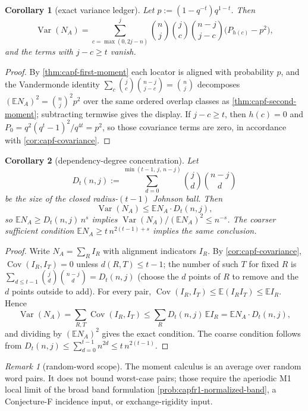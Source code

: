 \documentclass[11pt]{article}
\newtheorem{corollary}[corollary]{Corollary}
\theoremstyle{definition}
\theoremstyle{remark}
\newtheorem{remark}[remark]{Remark}
\providecommand{\E}{\mathbb E}
\providecommand{\Var}{\operatorname{Var}}
\begin{document}
\begin{corollary}[exact variance ledger]\label{cor:capf-exact-variance}
Let $p:=(1-q^{-t})q^{1-t}$.  Then
\[
\Var(N_A)=
\sum_{c=\max(0,2j-n)}^{j}
\binom{n}{j}\binom{j}{c}\binom{n-j}{j-c}
\bigl(P_{h(c)}-p^2\bigr),
\]
and the terms with $j-c\ge t$ vanish.
\end{corollary}

\begin{proof}
By \cref{thm:capf-first-moment} each locator is aligned with probability $p$, and the Vandermonde identity $\sum_c\binom jc\binom{n-j}{j-c}=\binom nj$ decomposes $(\E N_A)^2=\binom nj^2p^2$ over the same ordered overlap classes as \cref{thm:capf-second-moment}; subtracting termwise gives the display.  If $j-c\ge t$, then $h(c)=0$ and $P_0=q^2(q^t-1)^2/q^{4t}=p^2$, so those covariance terms are zero, in accordance with \cref{cor:capf-covariance}.
\end{proof}

\begin{corollary}[dependency-degree concentration]\label{cor:capf-dependency}
Let
\[
        D_t(n,j):=
        \sum_{d=0}^{\min(t-1,\,j,\,n-j)}
        \binom jd\binom{n-j}{d}
\]
be the size of the closed radius-$(t-1)$ Johnson ball.  Then
\[
        \Var(N_A)\le \E N_A\cdot D_t(n,j),
\]
so $\E N_A\ge D_t(n,j)\,n^s$ implies $\Var(N_A)/(\E N_A)^2\le n^{-s}$.  The coarser sufficient condition $\E N_A\ge t\,n^{2(t-1)+s}$ implies the same conclusion.
\end{corollary}

\begin{proof}
Write $N_A=\sum_RI_R$ with alignment indicators $I_R$.  By \cref{cor:capf-covariance}, $\operatorname{Cov}(I_R,I_T)=0$ unless $d(R,T)\le t-1$; the number of such $T$ for fixed $R$ is $\sum_{d\le t-1}\binom jd\binom{n-j}d=D_t(n,j)$ \textup{(choose the $d$ points of $R$ to remove and the $d$ points outside to add)}.  For every pair, $\operatorname{Cov}(I_R,I_T)\le\E(I_RI_T)\le\E I_R$.  Hence
\[
        \Var(N_A)=\sum_{R,T}\operatorname{Cov}(I_R,I_T)
        \le \sum_R D_t(n,j)\,\E I_R
        =\E N_A\cdot D_t(n,j),
\]
and dividing by $(\E N_A)^2$ gives the exact condition.  The coarse condition follows from $D_t(n,j)\le\sum_{d=0}^{t-1}n^{2d}\le t\,n^{2(t-1)}$.
\end{proof}

\begin{remark}[random-word scope]\label{rem:capf-moment-scope}
The moment calculus is an average over random word pairs.  It does not bound worst-case pairs; those require the aperiodic M1 local limit of the broad band formulation \cref{prob:capfr1-normalized-band}, a Conjecture-F incidence input, or exchange-rigidity input.
\end{remark}
\end{document}
